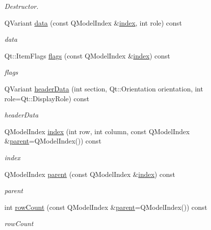 \begin{DoxyCompactItemize}
\begin{DoxyCompactList}\small\item\em Destructor. \end{DoxyCompactList}\item 
Q\-Variant \hyperlink{class_tree_model_aa9d2620ed71a36c3402a56de1ac51f88}{data} (const Q\-Model\-Index \&\hyperlink{class_tree_model_a2efaf132fe0622813075346d60129ae9}{index}, int role) const 
\begin{DoxyCompactList}\small\item\em data \end{DoxyCompactList}\item 
Qt\-::\-Item\-Flags \hyperlink{class_tree_model_ac087eed438ffc3d2bb1212dd5cdabc05}{flags} (const Q\-Model\-Index \&\hyperlink{class_tree_model_a2efaf132fe0622813075346d60129ae9}{index}) const 
\begin{DoxyCompactList}\small\item\em flags \end{DoxyCompactList}\item 
Q\-Variant \hyperlink{class_tree_model_a75a707dfa6c5bd8431434ceda27f06d0}{header\-Data} (int section, Qt\-::\-Orientation orientation, int role=Qt\-::\-Display\-Role) const 
\begin{DoxyCompactList}\small\item\em header\-Data \end{DoxyCompactList}\item 
Q\-Model\-Index \hyperlink{class_tree_model_a2efaf132fe0622813075346d60129ae9}{index} (int row, int column, const Q\-Model\-Index \&\hyperlink{class_tree_model_a210d05503fb8758b7bad1c4fd4c5ae6b}{parent}=Q\-Model\-Index()) const 
\begin{DoxyCompactList}\small\item\em index \end{DoxyCompactList}\item 
Q\-Model\-Index \hyperlink{class_tree_model_a210d05503fb8758b7bad1c4fd4c5ae6b}{parent} (const Q\-Model\-Index \&\hyperlink{class_tree_model_a2efaf132fe0622813075346d60129ae9}{index}) const 
\begin{DoxyCompactList}\small\item\em parent \end{DoxyCompactList}\item 
int \hyperlink{class_tree_model_a41ad83cee4891ae9f3c71960cd27bb24}{row\-Count} (const Q\-Model\-Index \&\hyperlink{class_tree_model_a210d05503fb8758b7bad1c4fd4c5ae6b}{parent}=Q\-Model\-Index()) const 
\begin{DoxyCompactList}\small\item\em row\-Count \end{DoxyCompactList}\item 

\end{DoxyCompactItemize}
